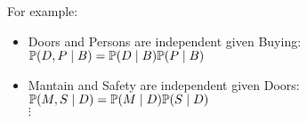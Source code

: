 \begin{frame}[fragile]
	For example:
	\begin{figure}
		\centering
		
	\end{figure}
	\begin{block}{}
		\begin{itemize}
			\item \alert{Doors} and \alert{Persons} are independent given \alert{Buying}: $\P( D , P \mid B ) = \P( D \mid B ) \P( P \mid B )$
			\item \alert{Mantain} and \alert{Safety} are independent given \alert{Doors}: $\P( M , S \mid D ) = \P( M \mid D ) \P( S \mid D )$
			\\$\vdots$
		\end{itemize}
	\end{block}
\end{frame}
